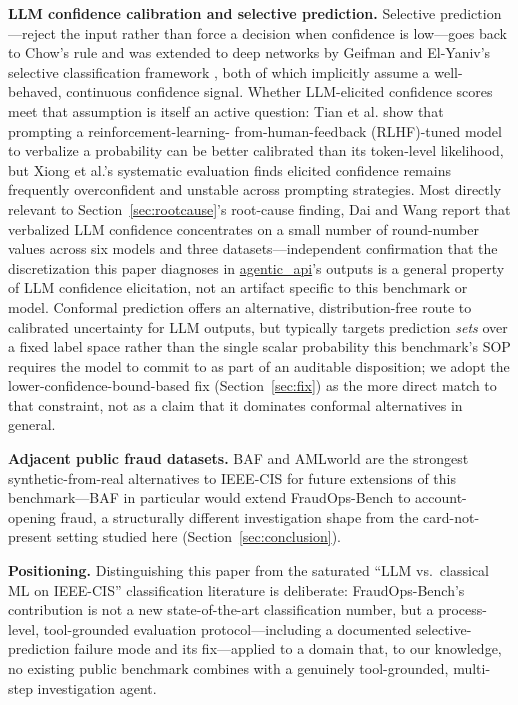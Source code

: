 \documentclass[]{ieeeaccess}
\newcommand{\code}[1]{\url{#1}}
\begin{document}
\textbf{LLM confidence calibration and selective prediction.} Selective
prediction---reject the input rather than force a decision when
confidence is low---goes back to Chow's rule \cite{chow1970} and was
extended to deep networks by Geifman and El-Yaniv's selective
classification framework \cite{geifman2017}, both of which implicitly
assume a well-behaved, continuous confidence signal. Whether LLM-elicited
confidence scores meet that assumption is itself an active question:
Tian et al. \cite{tian2023} show that prompting a reinforcement-learning-%
from-human-feedback (RLHF)-tuned model to verbalize a probability can be
better calibrated than its token-level likelihood, but Xiong et al.'s
systematic evaluation \cite{xiong2024} finds elicited confidence remains
frequently overconfident and unstable across prompting strategies. Most
directly relevant to Section~\ref{sec:rootcause}'s root-cause finding, Dai and Wang
\cite{dai2026} report that verbalized LLM confidence concentrates on a
small number of round-number values across six models and three
datasets---independent confirmation that the discretization this paper
diagnoses in \code{agentic_api}'s outputs is a general property of LLM
confidence elicitation, not an artifact specific to this benchmark or
model. Conformal prediction \cite{campos2024} offers an alternative,
distribution-free route to calibrated uncertainty for LLM outputs, but
typically targets prediction \textit{sets} over a fixed label space
rather than the single scalar probability this benchmark's SOP requires
the model to commit to as part of an auditable disposition; we adopt the
lower-confidence-bound-based fix (Section~\ref{sec:fix}) as the more direct match
to that constraint, not as a claim that it dominates conformal
alternatives in general.

\textbf{Adjacent public fraud datasets.} BAF \cite{baf2022} and AMLworld
\cite{amlworld2023} are the strongest synthetic-from-real alternatives to
IEEE-CIS for future extensions of this benchmark---BAF in particular
would extend FraudOps-Bench to account-opening fraud, a structurally
different investigation shape from the card-not-present setting studied
here (Section~\ref{sec:conclusion}).

\textbf{Positioning.} Distinguishing this paper from the saturated ``LLM
vs.\ classical ML on IEEE-CIS'' classification literature
\cite{fdb2022,finfrerag2025} is deliberate: FraudOps-Bench's contribution
is not a new state-of-the-art classification number, but a process-level,
tool-grounded evaluation protocol---including a documented
selective-prediction failure mode and its fix---applied to a domain
that, to our knowledge, no existing public benchmark combines with a
genuinely tool-grounded, multi-step investigation agent.
\end{document}
